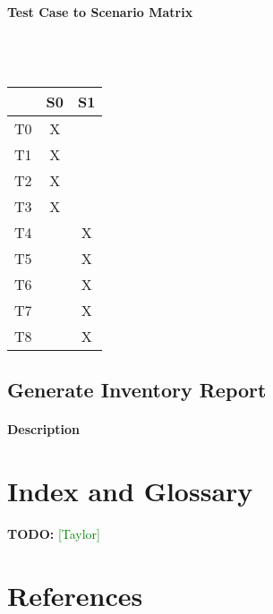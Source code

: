 \documentclass{article}
\newcommand{\taylor}{\textcolor{green}{[Taylor]}}
\begin{document}
\paragraph{Test Case to Scenario Matrix}~\\ \\
\begin{tabular}{ | c || c | c | }
\hline
    & S0 & S1 \\
\hline
\hline
T0 & X  &    \\
\hline
T1 & X  &    \\
\hline
T2 & X  &    \\
\hline
T3 & X  &    \\
\hline
T4 &    & X  \\
\hline
T5 &    & X  \\
\hline
T6 &    & X  \\
\hline
T7 &    & X  \\
\hline
T8 &    & X  \\
\hline
\end{tabular}

\subsection{Generate Inventory Report}
\paragraph{Description}


\section{Index and Glossary}
\textbf{TODO:} \taylor

\section{References}
\end{document}
